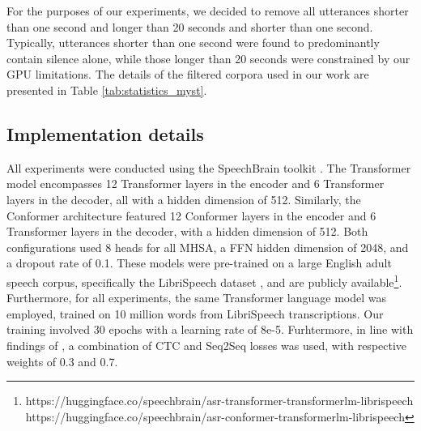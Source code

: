 For the purposes of our experiments, we decided to remove all utterances shorter than one second and longer than 20 seconds and shorter than one second. Typically, utterances shorter than one second were found to predominantly contain silence alone, while those longer than 20 seconds were constrained by our GPU limitations. The details of the filtered corpora used in our work are presented in Table \ref{tab:statistics_myst}. 

\subsection{Implementation details}

All experiments were conducted using the SpeechBrain toolkit \cite{speechbrain}. The Transformer model encompasses 12 Transformer layers in the encoder and 6 Transformer layers in the decoder, all with a hidden dimension of 512. Similarly, the Conformer architecture featured 12 Conformer layers in the encoder and 6 Transformer layers in the decoder, with a hidden dimension of 512. Both configurations used 8 heads for all MHSA, a FFN hidden dimension of 2048, and a dropout rate of 0.1. These models were pre-trained on a large English adult speech corpus, specifically the LibriSpeech dataset \cite{librispeech}, and are publicly available\footnote{https://huggingface.co/speechbrain/asr-transformer-transformerlm-librispeech\\ https://huggingface.co/speechbrain/asr-conformer-transformerlm-librispeech}. Furthermore, for all experiments, the same Transformer language model was employed, trained on 10 million words from LibriSpeech transcriptions. Our training involved 30 epochs with a learning rate of 8e-5. Furhtermore, in line with findings of \cite{gelin2021endtoend}, a combination of CTC and Seq2Seq losses was used, with respective weights of 0.3 and 0.7.

